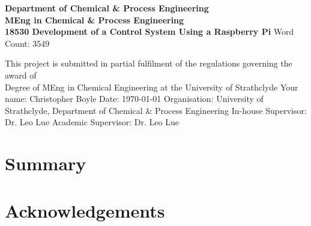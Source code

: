 \documentclass[a4]{report}
\def\atitle{Development of a Control System Using a Raspberry Pi}
\def\thewords{3549}
\def\achapter{preamble}
\begin{document}
	\begin{titlepage}
		\centering
		\vskip3cm
		{
			\bfseries\Large
			Department of Chemical \& Process Engineering\\
			\vskip1cm
			MEng in Chemical \& Process Engineering\\
			18530
			\vskip3cm
			\LARGE\atitle
		}
		\vskip3cm
		{\small Word Count: \thewords}
		\vskip1cm
		\begin{flushleft}
			This project is submitted in partial fulfilment of the regulations governing the award of \\
			Degree of MEng in Chemical Engineering at the University of Strathclyde
			\vskip2cm
			Your name: Christopher Boyle \hfill Date: \today
			\vskip1cm
			Organisation: University of Strathclyde, Department of Chemical \& Process Engineering\newline%
			In-house Supervisor: Dr. Leo Lue \newline%
			Academic Supervisor: Dr. Leo Lue
		\end{flushleft}
	\end{titlepage}

	
	\chapter*{Summary}
	\def\achapter{Summary}
	
	\def\achapter{Contents}
	\tableofcontents
	
	\chapter*{Acknowledgements}
	\def\achapter{Acknowledgements}
	
\end{document}
